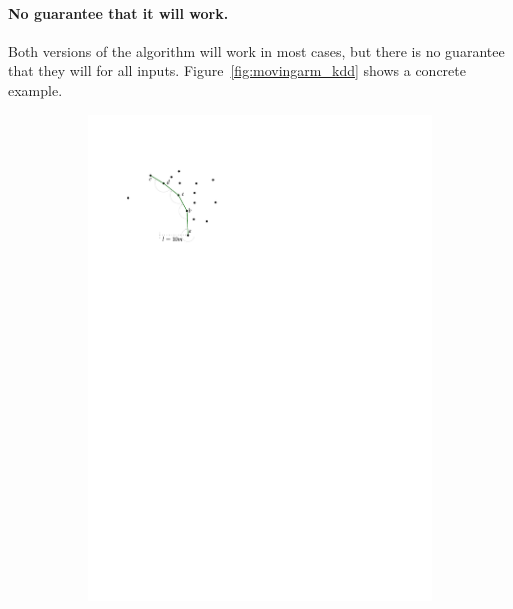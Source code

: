 %

\paragraph{No guarantee that it will work.} 
Both versions of the algorithm will work in most cases, but there is no guarantee that they will for all inputs.
Figure~\ref{fig:movingarm_kdd} shows a concrete example.
\begin{figure}
  \centering
  \begin{subfigure}[b]{0.3\linewidth}
    \centering
    \includegraphics[page=4,width=\textwidth]{figs/movingarm.pdf}
    \caption{}
  \end{subfigure}
  \qquad
  \begin{subfigure}[b]{0.3\linewidth}
    \centering

\end{subfigure}
\end{figure}

